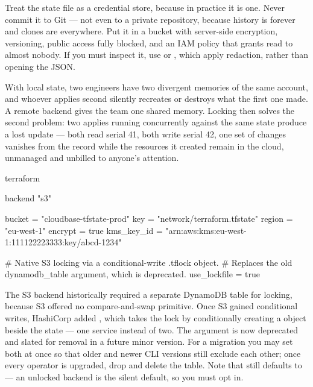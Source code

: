 \begin{secwarn}
Treat the state file as a credential store, because in practice it is one. Never commit it to Git --- not even to a private repository, because history is forever and clones are everywhere. Put it in a bucket with server-side encryption, versioning, public access fully blocked, and an IAM policy that grants read to almost nobody. If you must inspect it, use  or , which apply redaction, rather than opening the JSON.
\end{secwarn}

 With local state, two engineers have two divergent memories of the same account, and whoever applies second silently recreates or destroys what the first one made. A remote backend gives the team one shared memory. Locking then solves the second problem: two applies running concurrently against the same state produce a lost update --- both read serial 41, both write serial 42, one set of changes vanishes from the record while the resources it created remain in the cloud, unmanaged and unbilled to anyone's attention.

\begin{tfbox}
terraform {
  backend "s3" {
    bucket       = "cloudbase-tfstate-prod"
    key          = "network/terraform.tfstate"
    region       = "eu-west-1"
    encrypt      = true
    kms_key_id   = "arn:aws:kms:eu-west-1:111122223333:key/abcd-1234"

    # Native S3 locking via a conditional-write .tflock object.
    # Replaces the old dynamodb_table argument, which is deprecated.
    use_lockfile = true
  }
}
\end{tfbox}

\begin{infranote}
The S3 backend historically required a separate DynamoDB table for locking, because S3 offered no compare-and-swap primitive. Once S3 gained conditional writes, HashiCorp added , which takes the lock by conditionally creating a  object beside the state --- one service instead of two. The  argument is now deprecated and slated for removal in a future minor version. For a migration you may set both at once so that older and newer CLI versions still exclude each other; once every operator is upgraded, drop  and delete the table. Note that  still defaults to  --- an unlocked backend is the silent default, so you must opt in.
\end{infranote}

